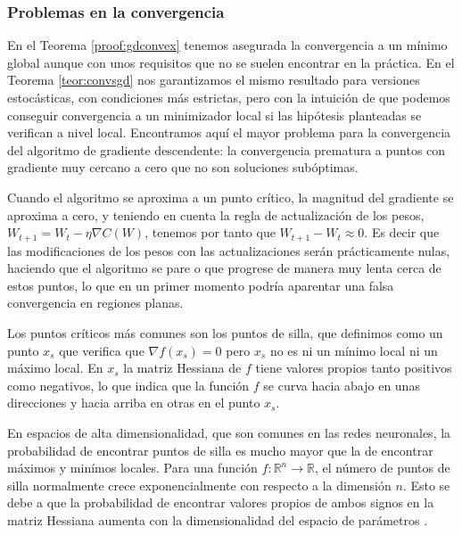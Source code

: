 \subsubsection{Problemas en la convergencia}



En el Teorema \ref{proof:gdconvex} tenemos asegurada la convergencia a un mínimo global aunque con unos requisitos que no se suelen encontrar en la práctica. En el Teorema \ref{teor:convsgd} nos garantizamos el mismo resultado para versiones estocásticas, con condiciones más estrictas, pero con la intuición de que podemos conseguir convergencia a un minimizador local si las hipótesis planteadas se verifican a nivel local. Encontramos aquí el mayor problema para la convergencia del algoritmo de gradiente descendente: la convergencia prematura a puntos con gradiente muy cercano a cero que no son soluciones subóptimas. 

Cuando el algoritmo se aproxima a un punto crítico, la magnitud del gradiente se aproxima a cero, y teniendo en cuenta la regla de actualización de los pesos, $W_{t+1}=W_t - \eta \nabla C(W)$, tenemos por tanto que $W_{t+1} - W_t \approx 0$. Es decir que las modificaciones de los pesos con las actualizaciones serán prácticamente nulas, haciendo que el algoritmo se pare o que progrese de manera muy lenta cerca de estos puntos, lo que en un primer momento podría aparentar una falsa convergencia en regiones planas. 

Los puntos críticos más comunes son los puntos de silla, que definimos como un punto $x_s$ que verifica que $\nabla f(x_s)=0$ pero $x_s$ no es ni un mínimo local ni un máximo local. En $x_s$ la matriz Hessiana de $f$ tiene valores propios tanto positivos como negativos, lo que indica que la función $f$ se curva hacia abajo en unas direcciones y hacia arriba en otras en el punto $x_s$.

En espacios de alta dimensionalidad, que son comunes en las redes neuronales, la probabilidad de encontrar puntos de silla es mucho mayor que la de encontrar máximos y minímos locales. Para una función $f:\mathbb{R}^n \rightarrow \mathbb{R}$, el número de puntos de silla normalmente crece exponencialmente con respecto a la dimensión $n$. Esto se debe a que la probabilidad de encontrar valores propios de ambos signos en la matriz Hessiana aumenta con la dimensionalidad del espacio de parámetros \cite{NIPS2014_17e23e50}. 

